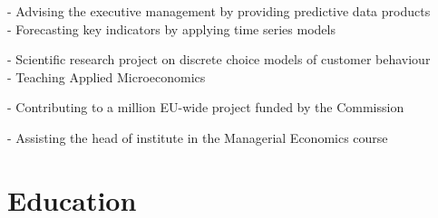 \documentclass[a4paper]{twentysecondcv} %
\begin{document}
\begin{twenty}
{\small - Advising the executive management by providing predictive data products\\
        - Forecasting key indicators by applying time series models
}

	
{\small - Scientific research project on discrete choice models of customer behaviour\\
        - Teaching Applied Microeconomics
}
	
{\small - Contributing to a  million EU-wide project funded by the Commission}
	
{\small - Assisting the head of institute in the Managerial Economics course}
	
\end{twenty}






\section{Education}
\end{document}
